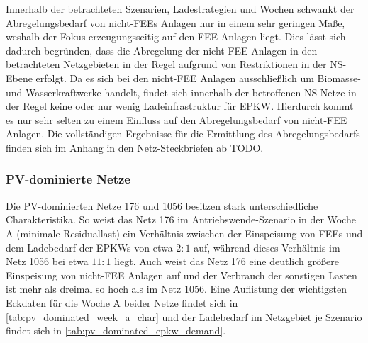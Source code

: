 

Innerhalb der betrachteten Szenarien, Ladestrategien und Wochen schwankt der Abregelungsbedarf von nicht-\glspl{FEE} Anlagen nur in einem sehr geringen Maße, weshalb der Fokus erzeugungsseitig auf den \gls{FEE} Anlagen liegt.
Dies lässt sich dadurch begründen, dass die Abregelung der nicht-\gls{FEE} Anlagen in den betrachteten Netzgebieten in der Regel aufgrund von Restriktionen in der \gls{NS}-Ebene erfolgt.
Da es sich bei den nicht-\gls{FEE} Anlagen ausschließlich um Biomasse- und Wasserkraftwerke handelt, findet sich innerhalb der betroffenen \gls{NS}-Netze in der Regel keine oder nur wenig Ladeinfrastruktur für \gls{EPKW}.
Hierdurch kommt es nur sehr selten zu einem Einfluss auf den Abregelungsbedarf von nicht-\gls{FEE} Anlagen.
Die vollständigen Ergebnisse für die Ermittlung des Abregelungsbedarfs finden sich im Anhang in den Netz-Steckbriefen ab {\color{red} TODO}.


\subsubsection{PV-dominierte Netze}

Die \gls{PV}-dominierten Netze \num{176} und \num{1056} besitzen stark unterschiedliche Charakteristika.
So weist das Netz \num{176} im Antriebswende-Szenario in der Woche A (minimale Residuallast) ein Verhältnis zwischen der Einspeisung von \glspl{FEE} und dem Ladebedarf der \glspl{EPKW} von etwa \(2:1\) auf, während dieses Verhältnis im Netz \num{1056} bei etwa \(11:1\) liegt.
Auch weist das Netz \num{176} eine deutlich größere Einspeisung von nicht-\gls{FEE} Anlagen auf und der Verbrauch der sonstigen Lasten ist mehr als dreimal so hoch als im Netz \num{1056}.
Eine Auflistung der wichtigsten Eckdaten für die Woche A beider Netze findet sich in \autoref{tab:pv_dominated_week_a_char} und der Ladebedarf im Netzgebiet je Szenario findet sich in \autoref{tab:pv_dominated_epkw_demand}.





